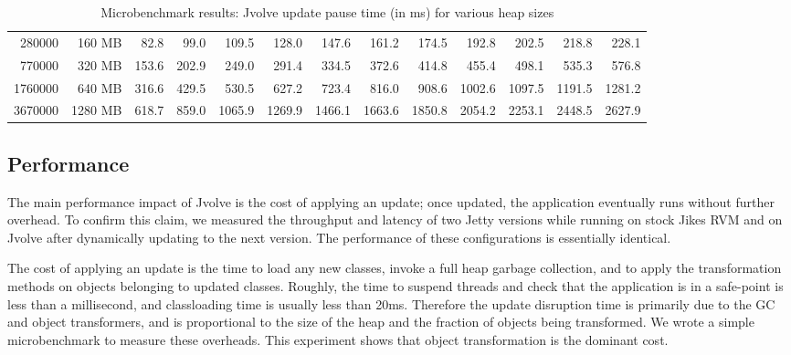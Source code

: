 \documentclass[9pt]{sigplanconf}
\newcommand{\DSU}{{\sc Jvolve}}
\newcommand{\JikesRVM}{Jikes RVM}
\begin{document}
\begin{table}[t]
\begin{footnotesize}
\begin{center}
\begin{tabular}{|r|r|rrrrrrrrrrr|}
 280000 &  160 MB &    82.8 &    99.0 &   109.5 &   128.0 &   147.6 &   161.2 &   174.5 &   192.8 &   202.5 &   218.8 &   228.1 \\
 770000 &  320 MB &   153.6 &   202.9 &   249.0 &   291.4 &   334.5 &   372.6 &   414.8 &   455.4 &   498.1 &   535.3 &   576.8 \\
1760000 &  640 MB &   316.6 &   429.5 &   530.5 &   627.2 &   723.4 &   816.0 &   908.6 &  1002.6 &  1097.5 &  1191.5 &  1281.2 \\
3670000 & 1280 MB &   618.7 &   859.0 &  1065.9 &  1269.9 &  1466.1 &  1663.6 &  1850.8 &  2054.2 &  2253.1 &  2448.5 &  2627.9 \\ \hline
\end{tabular}
\end{center}
\end{footnotesize}
\caption{Microbenchmark results: \DSU{} update pause time (in ms) for various heap sizes}
\label{tab:microbench}
\end{table}

\subsection{Performance}
\label{subsec:performance}

The main performance impact of \DSU{} is the cost of applying an update;
once updated, the application eventually runs without further overhead.  To confirm
this claim, we measured the throughput and latency of two Jetty versions while running on
stock \JikesRVM{} and on \DSU{} after dynamically updating to the next version. The performance of these configurations is
essentially identical.


The cost of applying an update is the time to load any new classes, invoke a
full heap garbage collection, and to apply the transformation methods on
objects belonging to updated classes.
Roughly,
the time to suspend threads and check
that the application is in a safe-point is less than a millisecond, and classloading
time is usually less than 20ms.
Therefore the update disruption time is primarily
due to the GC and object transformers, and is proportional
to the size of the heap and the fraction of objects being transformed.  We
wrote a simple microbenchmark to measure these overheads.
This experiment shows that object
transformation is the dominant cost.
\end{document}
